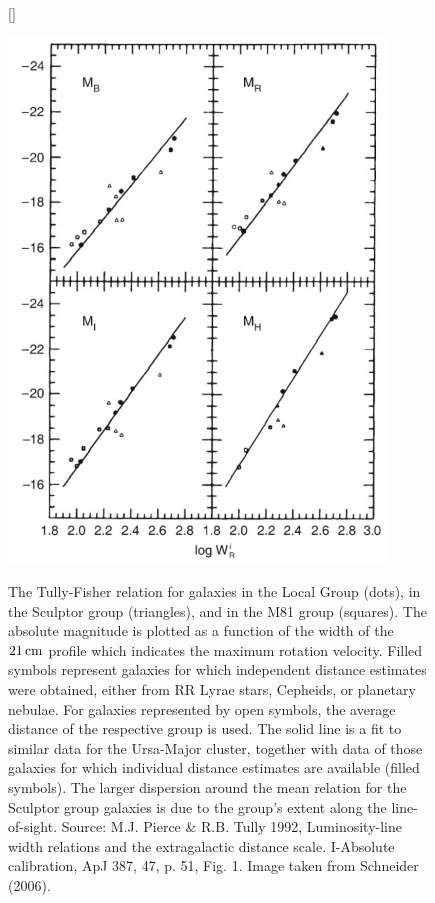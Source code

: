 \documentclass[a4paper,11pt]{article}
\begin{document}
\begin{figure}[h]
[\FBwidth]
{\caption{\footnotesize{The Tully-Fisher relation for galaxies in the Local Group (dots), in the Sculptor group (triangles), and in the M81 group (squares). The absolute magnitude is plotted as a function of the width of the $21\,{\rm cm}$ profile which indicates the maximum rotation velocity. Filled symbols represent galaxies for which independent distance estimates were obtained, either from RR Lyrae stars, Cepheids, or planetary nebulae. For galaxies represented by open symbols, the average distance of the respective group is used. The solid line is a fit to similar data for the Ursa-Major cluster, together with data of those galaxies for which individual distance estimates are available (filled symbols). The larger dispersion around the mean relation for the Sculptor group galaxies is due to the group’s extent along the line-of-sight. Source: M.J. Pierce \& R.B. Tully 1992, Luminosity-line width relations and the extragalactic distance scale. I-Absolute calibration, ApJ 387, 47, p. 51, Fig. 1. Image taken from Schneider (2006).}}
\label{fig:tullyfisher}}
{\includegraphics[width=10cm]{figures/TullyFisher.png}}
\end{figure}
\end{document}
